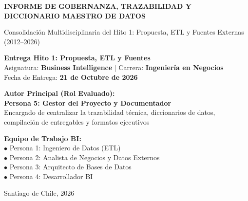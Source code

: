 \documentclass[11pt,a4paper]{article}
\begin{document}
\begin{titlepage}
    \centering
    \vspace*{1cm}
    {\Huge \bfseries \color{primaryblue} INFORME DE GOBERNANZA, TRAZABILIDAD Y DICCIONARIO MAESTRO DE DATOS\par}
    \vspace{0.4cm}
    {\LARGE \color{secondaryblue} Consolidación Multidisciplinaria del Hito 1: Propuesta, ETL y Fuentes Externas (2012--2026)\par}
    \vspace{1cm}

    \begin{tcolorbox}[colback=lightbg, colframe=primaryblue, width=\textwidth, arc=3mm]
        \centering
        \large \textbf{Entrega Hito 1: Propuesta, ETL y Fuentes}\\[2mm]
        \normalsize Asignatura: \textbf{Business Intelligence} | Carrera: \textbf{Ingeniería en Negocios}\\[1mm]
        Fecha de Entrega: \textbf{21 de Octubre de 2026}
    \end{tcolorbox}

    \vspace{1.8cm}
    \begin{minipage}{0.48\textwidth}
        \textbf{Autor Principal (Rol Evaluado):}\\
        \textbf{\color{primaryblue}Persona 5: Gestor del Proyecto y Documentador}\\
        Encargado de centralizar la trazabilidad técnica, diccionarios de datos, compilación de entregables y formatos ejecutivos
    \end{minipage}
    \hfill
    \begin{minipage}{0.48\textwidth}
        \textbf{Equipo de Trabajo BI:}\\
        $\bullet$ Persona 1: Ingeniero de Datos (ETL)\\
        $\bullet$ Persona 2: Analista de Negocios y Datos Externos\\
        $\bullet$ Persona 3: Arquitecto de Bases de Datos\\
        $\bullet$ Persona 4: Desarrollador BI
    \end{minipage}

    \vfill
    {\small \color{darkgray} Santiago de Chile, 2026}\par
\end{titlepage}
\end{document}
